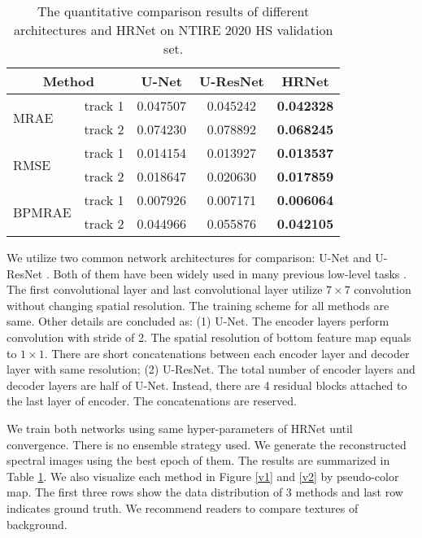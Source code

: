\documentclass[10pt,twocolumn,letterpaper]{article}
\begin{document}
\begin{table}[t]
\begin{center}
\begin{tabular}{lcccc}
\hline
\multicolumn{2}{c}{Method} & U-Net & U-ResNet & HRNet \\
\hline
\hline
\multirow{2}{*}{MRAE} & track 1 & 0.047507 & 0.045242 & \textbf{0.042328} \\
 & track 2 & 0.074230 & 0.078892 & \textbf{0.068245} \\
\hline
\multirow{2}{*}{RMSE} & track 1 & 0.014154 & 0.013927 & \textbf{0.013537} \\
 & track 2 & 0.018647 & 0.020630 & \textbf{0.017859} \\
\hline
\multirow{2}{*}{BPMRAE} & track 1 & 0.007926 & 0.007171 & \textbf{0.006064} \\
 & track 2 & 0.044966 & 0.055876 & \textbf{0.042105} \\
\hline
\end{tabular}
\end{center}
\caption{The quantitative comparison results of different architectures and HRNet on NTIRE 2020 HS validation set.}
\label{comparison}
\end{table}

We utilize two common network architectures for comparison: U-Net \cite{ronneberger2015u} and U-ResNet \cite{ronneberger2015u, he2016deep}. Both of them have been widely used in many previous low-level tasks \cite{isola2017image, iizuka2017globally, yu2019free, kupyn2018deblurgan, chen2018learning, zhao2019saliency}. The first convolutional layer and last convolutional layer utilize $7 \times 7$ convolution without changing spatial resolution. The training scheme for all methods are same. Other details are concluded as: (1) U-Net. The encoder layers perform convolution with stride of 2. The spatial resolution of bottom feature map equals to $1 \times 1$. There are short concatenations between each encoder layer and decoder layer with same resolution; (2) U-ResNet. The total number of encoder layers and decoder layers are half of U-Net. Instead, there are 4 residual blocks attached to the last layer of encoder. The concatenations are reserved.

We train both networks using same hyper-parameters of HRNet until convergence. There is no ensemble strategy used. We generate the reconstructed spectral images using the best epoch of them. The results are summarized in Table \ref{comparison}. We also visualize each method in Figure \ref{v1} and \ref{v2} by pseudo-color map. The first three rows show the data distribution of 3 methods and last row indicates ground truth. We recommend readers to compare textures of background.
\end{document}
